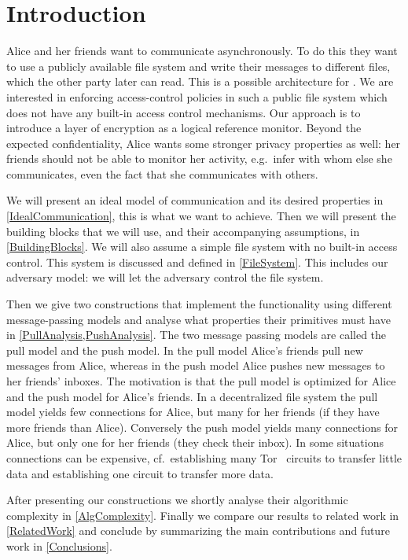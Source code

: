 \acresetall{}
\section{Introduction}\label{Introduction}

Alice and her friends want to communicate asynchronously.
To do this they want to use a publicly available file system and write their 
messages to different files, which the other party later can read.
This is a possible architecture for .
We are interested in enforcing access-control policies in such a public file 
system which does not have any built-in access control mechanisms.
Our approach is to introduce a layer of encryption as a logical reference 
monitor.
Beyond the expected confidentiality, Alice wants some stronger privacy 
properties as well: her friends should not be able to monitor her activity, 
e.g.\ infer with whom else she communicates, even the fact that she 
communicates with others.

We will present an ideal model of communication and its desired properties in 
\cref{IdealCommunication}, this is what we want to achieve.
Then we will present the building blocks that we will use, and their 
accompanying assumptions, in \cref{BuildingBlocks}.
We will also assume a simple file system with no built-in access control.
This system is discussed and defined in \cref{FileSystem}.
This includes our adversary model: we will let the adversary control the file 
system.

Then we give two constructions that implement the functionality using different 
message-passing models and analyse what properties their primitives must have 
in \cref{PullAnalysis,PushAnalysis}.
The two message passing models are called the pull model and the push model.
In the pull model Alice's friends pull new messages from Alice, whereas in the 
push model Alice pushes new messages to her friends' inboxes.
The motivation is that the pull model is optimized for Alice and the push model 
for Alice's friends.
In a decentralized file system the pull model yields few connections for Alice,
but many for her friends (if they have more friends than Alice).
Conversely the push model yields many connections for Alice, but only one for 
her friends (they check their inbox).
In some situations connections can be expensive, cf.\ establishing many 
Tor~\cite{Tor} circuits to transfer little data and establishing one circuit to 
transfer more data.

After presenting our constructions we shortly analyse their algorithmic 
complexity in \cref{AlgComplexity}.
Finally we compare our results to related work in \cref{RelatedWork} and 
conclude by summarizing the main contributions and future work in 
\cref{Conclusions}.



